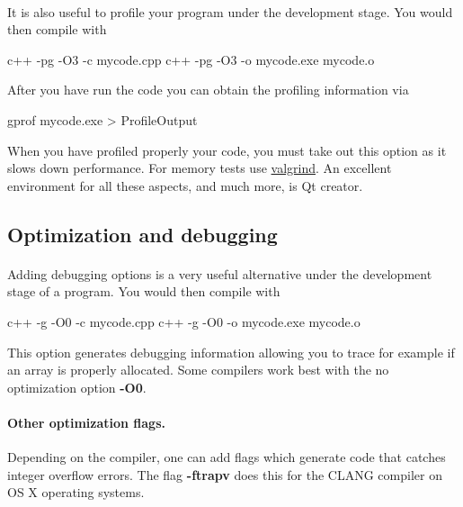 \documentclass[%
oneside,                 %
final,                   %
10pt]{article}
\begin{document}
\paragraph{}
It is also useful to profile your program under the development stage.
You would then compile with 



\bcppcod
c++  -pg -O3 -c  mycode.cpp
c++  -pg -O3 -o  mycode.exe  mycode.o

\ecppcod

After you have run the code you can obtain the profiling information via


\bcppcod
gprof mycode.exe >  ProfileOutput

\ecppcod

When you have profiled properly your code, you must take out this option as it 
slows down performance.
For memory tests use \href{{http://www.valgrind.org}}{valgrind}. An excellent environment for all these aspects, and much  more, is  Qt creator.



\subsection{Optimization and debugging}

\paragraph{}
Adding debugging options is a very useful alternative under the development stage of a program.
You would then compile with 



\bcppcod
c++  -g -O0 -c  mycode.cpp
c++  -g -O0 -o  mycode.exe  mycode.o

\ecppcod

This option generates debugging information allowing you to trace for example if an array is properly allocated. Some compilers work best with the no optimization option \textbf{-O0}.



\paragraph{Other optimization flags.}
Depending on the compiler, one can add flags which generate code that catches integer overflow errors. 
The flag \textbf{-ftrapv} does this for the CLANG compiler on OS X operating systems.
\end{document}
